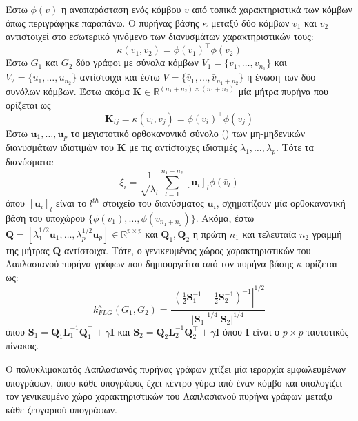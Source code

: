 Έστω $\phi(v)$ η αναπαράσταση ενός κόμβου $v$ από τοπικά χαρακτηριστικά των κόμβων όπως περιγράφηκε παραπάνω.
Ο πυρήνας βάσης $\kappa$ μεταξύ δύο κόμβων $v_1$ και $v_2$ αντιστοιχεί στο εσωτερικό γινόμενο των διανυσμάτων χαρακτηριστικών τους:
\begin{equation}
    \kappa(v_1, v_2) = \phi(v_1)^\top \phi(v_2) 
\end{equation}
Έστω $G_1$ και $G_2$ δύο γράφοι με σύνολα κόμβων $V_1 = \{ v_1, \ldots, v_{n_1}\}$ και $V_2 = \{ u_1, \ldots, u_{n_2} \}$ αντίστοιχα και έστω $\bar{V} = \{ \bar{v}_1, \ldots, \bar{v}_{n_1+n_2} \}$ η ένωση των δύο συνόλων κόμβων.
Έστω ακόμα $\mathbf{K} \in \mathbb{R}^{(n_1+n_2) \times (n_1+n_2)}$ μία μήτρα πυρήνα που ορίζεται ως
\begin{equation}
    \mathbf{K}_{ij} = \kappa(\bar{v}_i, \bar{v}_j) = \phi(\bar{v}_i)^\top \phi(\bar{v}_j)
\end{equation}
Έστω $\mathbf{u}_1, \ldots, \mathbf{u}_p$ το μεγιστοτικό ορθοκανονικό σύνολο () των μη-μηδενικών διανυσμάτων ιδιοτιμών του $\mathbf{K}$
με τις αντίστοιχες ιδιοτιμές $\lambda_1, \ldots, \lambda_p$.
Τότε τα διανύσματα:
\begin{equation}
    \xi_i = \frac{1}{\sqrt{\lambda_i}} \sum_{l=1}^{n_1+n_2} [\mathbf{u}_i]_l \phi(\bar{v}_l)
\end{equation}
όπου $[\mathbf{u}_i]_l$ είναι το $l^{th}$ στοιχείο του διανύσματος $\mathbf{u}_i$, σχηματίζουν μία ορθοκανονική βάση του υποχώρου $\{ \phi(\bar{v}_1), \ldots, \phi(\bar{v}_{n_1+n_2}) \}$.
Ακόμα, έστω $\mathbf{Q} = [ \lambda_1^{1/2} \mathbf{u}_1, \ldots,\lambda_p^{1/2} \mathbf{u}_p ] \in \mathbb{R}^{p \times p}$ και $\mathbf{Q}_1, \mathbf{Q}_2$ η πρώτη $n_1$ και τελευταία $n_2 $ γραμμή της μήτρας $\mathbf{Q}$ αντίστοιχα.
Τότε, ο γενικευμένος χώρος χαρακτηριστικών του Λαπλασιανού πυρήνα γράφων που δημιουργείται από τον πυρήνα βάσης $\kappa$ ορίζεται ως:
\begin{equation}
    k_{FLG}^\kappa(G_1, G_2) = \frac{| (\frac{1}{2} \mathbf{S}_1^{-1} + \frac{1}{2} \mathbf{S}_2^{-1} )^{-1} |^{1/2}}{|\mathbf{S}_1|^{1/4} |\mathbf{S}_2|^{1/4}} 
\end{equation}
όπου $\mathbf{S}_1 = \mathbf{Q}_1 \mathbf{L}_1^{-1} \mathbf{Q}_1^\top + \gamma \mathbf{I}$ και $\mathbf{S}_2 = \mathbf{Q}_2 \mathbf{L}_2^{-1} \mathbf{Q}_2^\top + \gamma \mathbf{I}$ όπου $\mathbf{I}$ είναι ο $p \times p$ ταυτοτικός πίνακας.\par
Ο πολυκλιμακωτός Λαπλασιανός πυρήνας γράφων χτίζει μία ιεραρχία εμφωλευμένων υπογράφων, όπου κάθε υπογράφος έχει κέντρο γύρω από έναν κόμβο και υπολογίζει τον γενικευμένο χώρο χαρακτηριστικών του Λαπλασιανού πυρήνα γράφων μεταξύ κάθε ζευγαριού υπογράφων.
